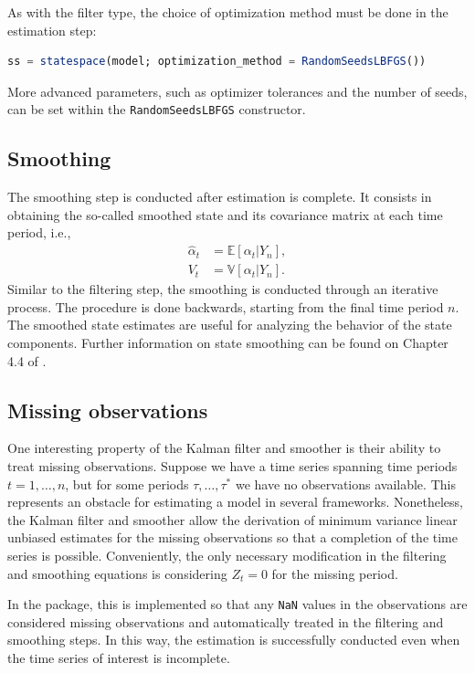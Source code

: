 \documentclass{juliacon}
\begin{document}
As with the filter type, the choice of optimization method must be done in the estimation step:
%
\begin{lstlisting}[language = Julia]
ss = statespace(model; optimization_method = RandomSeedsLBFGS())
\end{lstlisting}

More advanced parameters, such as optimizer tolerances and the number of seeds, can be set within the \texttt{RandomSeedsLBFGS} constructor.

\subsection{Smoothing}

The smoothing step is conducted after estimation is complete. It consists in obtaining the so-called smoothed state and its covariance matrix at each time period, i.e.,
%
\begin{align}
    \hat{\alpha}_{t} &= \mathbb{E}[\alpha_{t} | Y_{n}], \\
    V_{t} &= \mathbb{V}[\alpha_{t} | Y_{n}].
\end{align}
%
Similar to the filtering step, the smoothing is conducted through an iterative process. The procedure is done backwards, starting from the final time period $n$. The smoothed state estimates are useful for analyzing the behavior of the state components. Further information on state smoothing can be found on Chapter 4.4 of \cite{durbin2012time}.

\subsection{Missing observations}

One interesting property of the Kalman filter and smoother is their ability to treat missing observations. Suppose we have a time series spanning time periods $t = 1, \dots, n$, but for some periods $\tau, \dots, \tau^{*}$ we have no observations available. This represents an obstacle for estimating a model in several frameworks. Nonetheless, the Kalman filter and smoother allow the derivation of minimum variance linear unbiased estimates for the missing observations so that a completion of the time series is possible. Conveniently, the only necessary modification in the filtering and smoothing equations is considering $Z_{t} = 0$ for the missing period.

In the package, this is implemented so that any \texttt{NaN} values in the observations are considered missing observations and automatically treated in the filtering and smoothing steps. In this way, the estimation is successfully conducted even when the time series of interest is incomplete.
\end{document}
